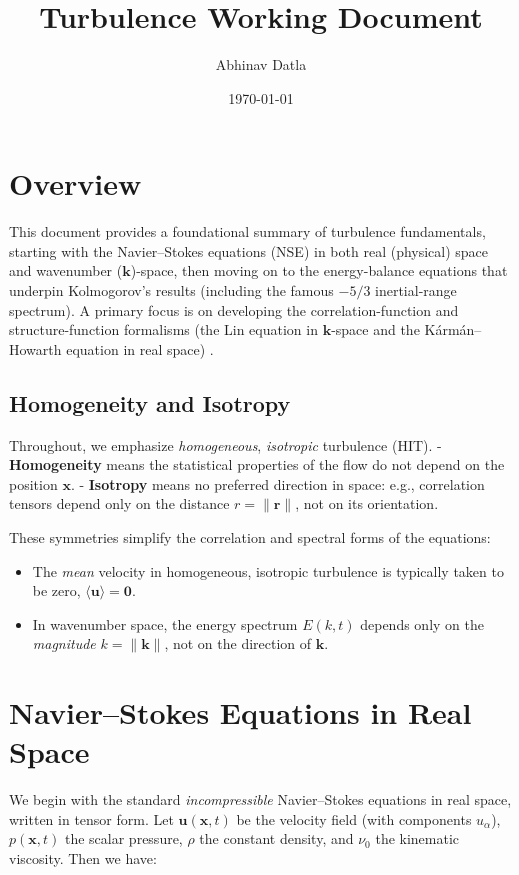 \documentclass[12pt,a4paper]{article}
\title{\textbf{Turbulence Working Document}}
\author{Abhinav Datla}
\date{\today}
\newcommand\ub{\mathbf{u}}   %
\newcommand\pb{p}           %
\newcommand\x{\mathbf{x}}    %
\newcommand\kvec{\mathbf{k}} %
\begin{document}
\maketitle

\section{Overview}

This document provides a foundational summary of turbulence fundamentals, starting with the Navier--Stokes equations (NSE) in both real (physical) space and wavenumber (\(\kvec\))-space, then moving on to the energy-balance equations that underpin Kolmogorov’s results (including the famous \(-5/3\) inertial-range spectrum).  A primary focus is on developing the correlation-function and structure-function formalisms (the Lin equation in \(\kvec\)-space and the Kármán–Howarth equation in real space) \cite{McComb14a}. 

\subsection{Homogeneity and Isotropy}

Throughout, we emphasize \emph{homogeneous}, \emph{isotropic} turbulence (HIT).  
- \textbf{Homogeneity} means the statistical properties of the flow do not depend on the position \(\x\).  
- \textbf{Isotropy} means no preferred direction in space: e.g., correlation tensors depend only on the distance \(r = \|\mathbf{r}\|\), not on its orientation.

These symmetries simplify the correlation and spectral forms of the equations:
\begin{itemize}
\item The \emph{mean} velocity in homogeneous, isotropic turbulence is typically taken to be zero, \(\langle \ub \rangle = \mathbf{0}\).  
\item In wave\-number space, the energy spectrum \(E(k,t)\) depends only on the \emph{magnitude} \(k = \|\kvec\|\), not on the direction of \(\kvec\).
\end{itemize}

\section{Navier--Stokes Equations in Real Space}
We begin with the standard \emph{incompressible} Navier--Stokes equations in real space, written in tensor form.  Let \(\ub(\x,t)\) be the velocity field (with components \(u_\alpha\)), \(\pb(\x,t)\) the scalar pressure, \(\rho\) the constant density, and \(\nu_0\) the kinematic viscosity.  Then we have:
\end{document}
